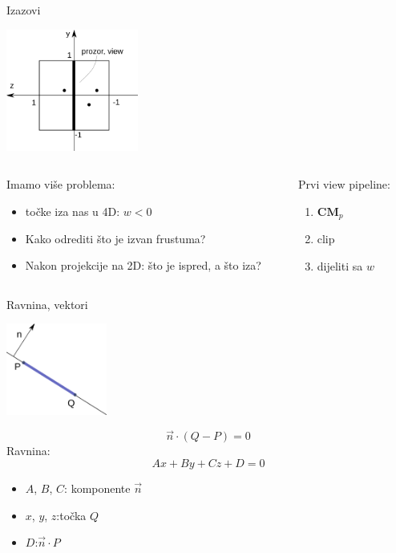 \documentclass[9pt]{beamer}
\begin{document}
\begin{frame}{Izazovi}
	\begin{center}
		\includegraphics[height=4cm]{slike/p05_01.png}
	\end{center}
	\begin{columns}
		\begin{column}{0.48\textwidth}
			Imamo više problema:
			\begin{itemize}
				\item točke iza nas u 4D: $w < 0$
				\item Kako odrediti što je izvan frustuma?
				\item Nakon projekcije na 2D: što je ispred, a što iza?
			\end{itemize}
		\end{column}
		\begin{column}{0.48\textwidth}
			Prvi view pipeline:
			\begin{enumerate}
				\item $ \mathbf{C}\mathbf{M}_p$
				\item clip
				\item dijeliti sa $w$
			\end{enumerate}
		\end{column}
	\end{columns}
\end{frame}

\begin{frame}{Ravnina, vektori}
	\begin{center}
		\includegraphics[height=3cm]{slike/p05_02.png}
	\end{center}
	$$
	\vec{n}\cdot(Q-P)=0
	$$
	Ravnina:
	$$Ax+By+Cz+D=0$$
	\begin{itemize}
		\item $A$, $B$, $C$:  \quad komponente $\vec{n}$
		\item $x$, $y$, $z$:\quad \quad  točka $Q$
		\item $D$:\quad  \quad \quad \quad $\vec{n}\cdot P$
	\end{itemize}
\end{frame}
\end{document}
